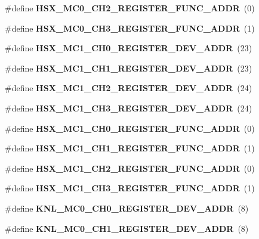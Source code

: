 \begin{DoxyCompactItemize}
\#define {\bfseries H\+S\+X\+\_\+\+M\+C0\+\_\+\+C\+H2\+\_\+\+R\+E\+G\+I\+S\+T\+E\+R\+\_\+\+F\+U\+N\+C\+\_\+\+A\+D\+DR}~(0)
\item 
\mbox{\label{types_8h_ad76e5a152d2d76ace9bac013487e664e}} 
\#define {\bfseries H\+S\+X\+\_\+\+M\+C0\+\_\+\+C\+H3\+\_\+\+R\+E\+G\+I\+S\+T\+E\+R\+\_\+\+F\+U\+N\+C\+\_\+\+A\+D\+DR}~(1)
\item 
\mbox{\label{types_8h_a57e3b1424a04c402463db9cca9323c1b}} 
\#define {\bfseries H\+S\+X\+\_\+\+M\+C1\+\_\+\+C\+H0\+\_\+\+R\+E\+G\+I\+S\+T\+E\+R\+\_\+\+D\+E\+V\+\_\+\+A\+D\+DR}~(23)
\item 
\mbox{\label{types_8h_a9d46ab436c323c909918a3287c1c4c7f}} 
\#define {\bfseries H\+S\+X\+\_\+\+M\+C1\+\_\+\+C\+H1\+\_\+\+R\+E\+G\+I\+S\+T\+E\+R\+\_\+\+D\+E\+V\+\_\+\+A\+D\+DR}~(23)
\item 
\mbox{\label{types_8h_aa125c331d375c1164ae6a616eec31014}} 
\#define {\bfseries H\+S\+X\+\_\+\+M\+C1\+\_\+\+C\+H2\+\_\+\+R\+E\+G\+I\+S\+T\+E\+R\+\_\+\+D\+E\+V\+\_\+\+A\+D\+DR}~(24)
\item 
\mbox{\label{types_8h_a2ef6fa583fd69484b2128c682554cfab}} 
\#define {\bfseries H\+S\+X\+\_\+\+M\+C1\+\_\+\+C\+H3\+\_\+\+R\+E\+G\+I\+S\+T\+E\+R\+\_\+\+D\+E\+V\+\_\+\+A\+D\+DR}~(24)
\item 
\mbox{\label{types_8h_a9e00a2ce3e8556188d647e194d81a060}} 
\#define {\bfseries H\+S\+X\+\_\+\+M\+C1\+\_\+\+C\+H0\+\_\+\+R\+E\+G\+I\+S\+T\+E\+R\+\_\+\+F\+U\+N\+C\+\_\+\+A\+D\+DR}~(0)
\item 
\mbox{\label{types_8h_aee9cd6ca3ced8a3c153636089964b1c4}} 
\#define {\bfseries H\+S\+X\+\_\+\+M\+C1\+\_\+\+C\+H1\+\_\+\+R\+E\+G\+I\+S\+T\+E\+R\+\_\+\+F\+U\+N\+C\+\_\+\+A\+D\+DR}~(1)
\item 
\mbox{\label{types_8h_a632f2964790894881ba99d35b115a597}} 
\#define {\bfseries H\+S\+X\+\_\+\+M\+C1\+\_\+\+C\+H2\+\_\+\+R\+E\+G\+I\+S\+T\+E\+R\+\_\+\+F\+U\+N\+C\+\_\+\+A\+D\+DR}~(0)
\item 
\mbox{\label{types_8h_a55266623de7c9f6adf4ad9a97f7412a6}} 
\#define {\bfseries H\+S\+X\+\_\+\+M\+C1\+\_\+\+C\+H3\+\_\+\+R\+E\+G\+I\+S\+T\+E\+R\+\_\+\+F\+U\+N\+C\+\_\+\+A\+D\+DR}~(1)
\item 
\mbox{\label{types_8h_a3fad6fd65312850bf02e8a66287a7766}} 
\#define {\bfseries K\+N\+L\+\_\+\+M\+C0\+\_\+\+C\+H0\+\_\+\+R\+E\+G\+I\+S\+T\+E\+R\+\_\+\+D\+E\+V\+\_\+\+A\+D\+DR}~(8)
\item 
\mbox{\label{types_8h_a76e57d57acef84e2c055c3078c25d8eb}} 
\#define {\bfseries K\+N\+L\+\_\+\+M\+C0\+\_\+\+C\+H1\+\_\+\+R\+E\+G\+I\+S\+T\+E\+R\+\_\+\+D\+E\+V\+\_\+\+A\+D\+DR}~(8)

\end{DoxyCompactItemize}
